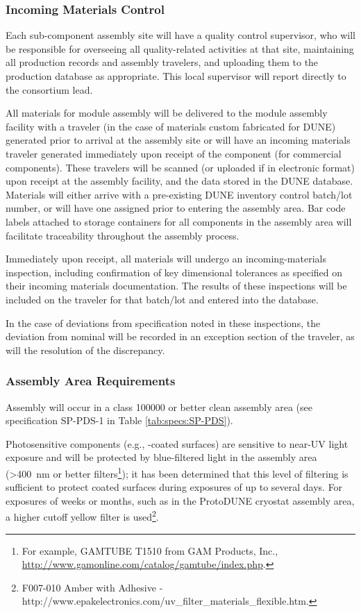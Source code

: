 \subsubsection{Incoming Materials Control}

Each  sub-component assembly site will have a quality control supervisor, who will be responsible for overseeing all quality-related activities at that site, maintaining all production records and assembly travelers, and uploading them to the production database as appropriate.   This local supervisor will report directly to the  consortium lead.

All materials for  module assembly will be delivered to the  module assembly facility with a  traveler (in the case of materials custom fabricated for DUNE) generated prior to arrival at the assembly site or will have an incoming materials traveler generated immediately upon receipt of the component (for commercial components).  These travelers will be scanned (or uploaded if in electronic format) upon receipt at the assembly facility, and the data stored in the DUNE  database.  Materials will either arrive with a pre-existing DUNE inventory control batch/lot number, or will have one assigned prior to entering the assembly area.  Bar code labels attached to storage containers for all components in the assembly area will facilitate traceability throughout the assembly process.

Immediately upon receipt, all materials will undergo an incoming-materials inspection, including confirmation of key dimensional tolerances as specified on their incoming materials documentation.  
The results of these inspections will be included on the traveler for that batch/lot and entered into the database.

In the case of deviations from specification noted in these inspections, the deviation from nominal will be recorded in an exception section of the traveler, as will the resolution of the discrepancy.

\subsubsection{Assembly Area Requirements}

Assembly will occur in a class \num{100000} or better clean assembly area (see specification SP-PDS-1 in Table \ref{tab:specs:SP-PDS}).  

Photosensitive components (e.g., -coated surfaces) are sensitive to near-UV light exposure and will be protected by blue-filtered light in the assembly area (>\SI{400}{nm} or better filters\footnote{For example, GAMTUBE T1510\texttrademark{} from GAM Products, Inc., \url{http://www.gamonline.com/catalog/gamtube/index.php}.}); it has been determined that this level of filtering is sufficient to protect coated surfaces during  exposures of up to several days. For exposures of weeks or months, such as in the ProtoDUNE cryostat assembly area, a higher cutoff yellow filter is used\footnote{F007-010\texttrademark{} Amber with Adhesive - http://www.epakelectronics.com/uv\_filter\_materials\_flexible.htm.}. 

